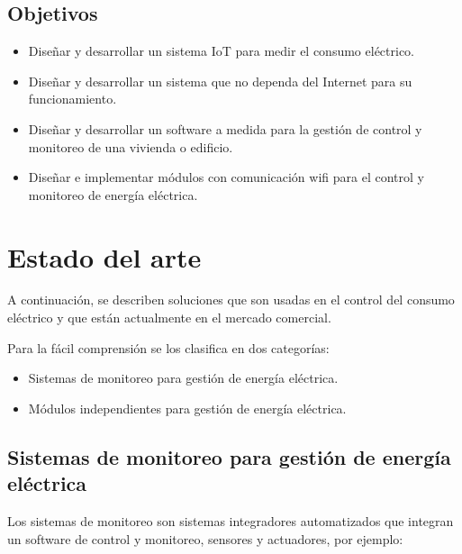 \subsection{Objetivos}
\begin{itemize}
\item Diseñar y desarrollar un sistema IoT para medir el consumo eléctrico.
\item Diseñar y desarrollar un sistema que no dependa del Internet para su funcionamiento.
\item Diseñar y desarrollar un software a medida para la gestión de control y monitoreo de una vivienda o edificio.
\item Diseñar e implementar módulos con comunicación wifi para el control y monitoreo de energía eléctrica.
\end{itemize}

\section{Estado del arte}

A continuación, se describen soluciones que son usadas en el control del consumo eléctrico y que están actualmente en el mercado comercial. 

Para la fácil comprensión se los clasifica en dos categorías:

\begin{itemize}
\item Sistemas de monitoreo para gestión de energía eléctrica.
\item Módulos independientes para gestión de energía eléctrica.
\end{itemize} 

\subsection{Sistemas de monitoreo para gestión de energía eléctrica}
Los sistemas de monitoreo son sistemas integradores automatizados que integran un software de control y monitoreo, sensores y actuadores, por ejemplo:

